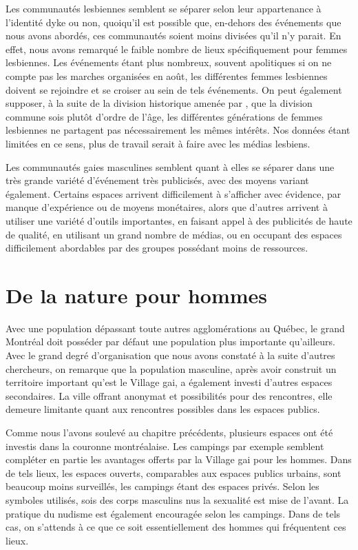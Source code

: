 Les communautés lesbiennes semblent se séparer selon leur appartenance à l'identité dyke ou non, quoiqu'il est possible que, en-dehors des événements que nous avons abordés, ces communautés soient moins divisées qu'il n'y parait.
En effet, nous avons remarqué le faible nombre de lieux spécifiquement pour femmes lesbiennes.
Les événements étant plus nombreux, souvent apolitiques si on ne compte pas les marches organisées en août, les différentes femmes lesbiennes doivent se rejoindre et se croiser au sein de tels événements.
On peut également supposer, à la suite de la division historique amenée par \citet{Giraud2014}, que la division commune sois plutôt d'ordre de l'âge, les différentes générations de femmes lesbiennes ne partagent pas nécessairement les mêmes intérêts.
Nos données étant limitées en ce sens, plus de travail serait à faire avec les médias lesbiens.

Les communautés gaies masculines semblent quant à elles se séparer dans une très grande variété d'événement très publicisés, avec des moyens variant également.
Certains espaces arrivent difficilement à s'afficher avec évidence, par manque d'expérience ou de moyens monétaires, alors que d'autres arrivent à utiliser une variété d'outils importantes, en faisant appel à des publicités de haute de qualité, en utilisant un grand nombre de médias, ou en occupant des espaces difficilement abordables par des groupes possédant moins de ressources.

\section{De la nature pour hommes}
\label{sec:de_la_nature_pour_hommes}
Avec une population dépassant toute autres agglomérations au Québec, le grand Montréal doit posséder par défaut une population \lgbt{} plus importante qu'ailleurs.
Avec le grand degré d'organisation que nous avons constaté à la suite d'autres chercheurs, on remarque que la population masculine, après avoir construit un territoire important qu'est le Village gai, a également investi d'autres espaces secondaires.
La ville offrant anonymat et possibilités pour des rencontres, elle demeure limitante quant aux rencontres possibles dans les espaces publics.

Comme nous l'avons soulevé au chapitre précédents, plusieurs espaces ont été investis dans la couronne montréalaise.
Les campings par exemple semblent compléter en partie les avantages offerts par la Village gai pour les hommes.
Dans de tels lieux, les espaces ouverts, comparables aux espaces publics urbains, sont beaucoup moins surveillés, les campings étant  des espaces privés.
Selon les symboles utilisés, sois des corps masculins nus la sexualité est mise de l'avant.
La pratique du nudisme est également encouragée selon les campings.
Dans de tels cas, on s'attends à ce que ce soit essentiellement des hommes qui fréquentent ces lieux.

